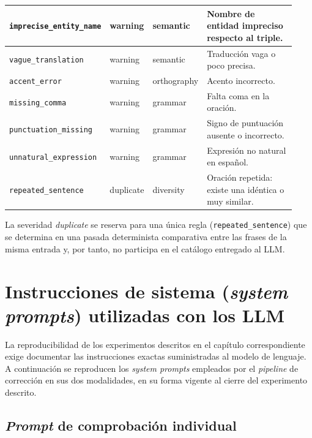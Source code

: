\begin{longtable}{|p{0.26\linewidth}|p{0.13\linewidth}|p{0.18\linewidth}|p{0.36\linewidth}|}
	\texttt{imprecise\_entity\_name} & warning            & semantic           & Nombre de entidad impreciso respecto al triple.               \\ \hline
	\texttt{vague\_translation}      & warning            & semantic           & Traducción vaga o poco precisa.                               \\ \hline
	\texttt{accent\_error}           & warning            & orthography        & Acento incorrecto.                                            \\ \hline
	\texttt{missing\_comma}          & warning            & grammar            & Falta coma en la oración.                                     \\ \hline
	\texttt{punctuation\_missing}    & warning            & grammar            & Signo de puntuación ausente o incorrecto.                     \\ \hline
	\texttt{unnatural\_expression}   & warning            & grammar            & Expresión no natural en español.                              \\ \hline
	\texttt{repeated\_sentence}      & duplicate          & diversity          & Oración repetida: existe una idéntica o muy similar.          \\ \hline
\end{longtable}

La severidad \textit{duplicate} se reserva para una única regla
(\texttt{repeated\_sentence}) que se determina en una pasada determinista
comparativa entre las frases de la misma entrada y, por tanto, no participa en
el catálogo entregado al LLM.

\chapter{Instrucciones de sistema (\textit{system prompts}) utilizadas con los LLM}

La reproducibilidad de los experimentos descritos en el capítulo
correspondiente exige documentar las instrucciones exactas suministradas al
modelo de lenguaje. A continuación se reproducen los \textit{system prompts}
empleados por el \textit{pipeline} de corrección en sus dos modalidades, en su
forma vigente al cierre del experimento descrito.

\section{\textit{Prompt} de comprobación individual}

